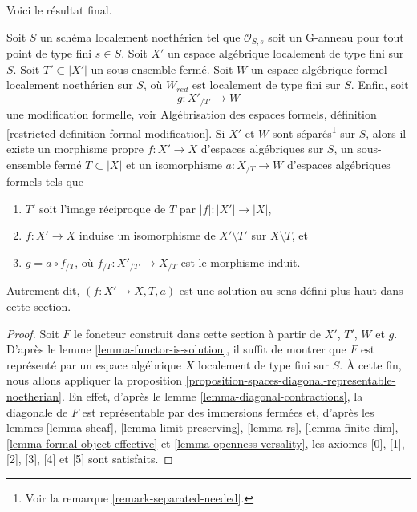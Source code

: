 \noindent
Voici le résultat final.

\begin{theorem}
\label{theorem-contractions}
\begin{reference}
\cite[théorème 3.1]{ArtinII}
\end{reference}
Soit $S$ un schéma localement noethérien tel que $\mathcal{O}_{S, s}$
soit un G-anneau pour tout point de type fini $s \in S$. Soit $X'$ un espace algébrique
localement de type fini sur $S$. Soit $T' \subset |X'|$ un sous-ensemble fermé.
Soit $W$ un espace algébrique formel localement noethérien sur $S$,
où $W_{red}$ est localement de type fini sur $S$. Enfin, soit
$$
g : X'_{/T'} \longrightarrow W
$$
une modification formelle, voir Algébrisation des espaces formels, définition
\ref{restricted-definition-formal-modification}. Si $X'$ et $W$ sont
séparés\footnote{Voir la remarque \ref{remark-separated-needed}.} sur $S$, alors
il existe un morphisme propre $f : X' \to X$ d'espaces algébriques sur $S$,
un sous-ensemble fermé $T \subset |X|$ et un isomorphisme $a : X_{/T} \to W$
d'espaces algébriques formels tels que
\begin{enumerate}
\item $T'$ soit l'image réciproque de $T$ par $|f| : |X'| \to |X|$,
\item $f : X' \to X$ induise un isomorphisme de $X' \setminus T'$ sur
$X \setminus T$, et
\item $g = a \circ f_{/T}$, où $f_{/T} : X'_{/T'} \to X_{/T}$
est le morphisme induit.
\end{enumerate}
Autrement dit, $(f : X' \to X, T, a)$ est une solution au sens défini plus haut dans
cette section.
\end{theorem}

\begin{proof}
Soit $F$ le foncteur construit dans cette section à partir de $X'$, $T'$, $W$ et $g$.
D'après le lemme \ref{lemma-functor-is-solution}, il suffit de montrer que
$F$ est représenté par un espace algébrique $X$ localement de type fini sur $S$.
À cette fin, nous allons appliquer la
proposition \ref{proposition-spaces-diagonal-representable-noetherian}.
En effet, d'après le lemme \ref{lemma-diagonal-contractions},
la diagonale de $F$ est représentable par des immersions fermées
et, d'après les
lemmes \ref{lemma-sheaf}, \ref{lemma-limit-preserving},
\ref{lemma-rs}, \ref{lemma-finite-dim},
\ref{lemma-formal-object-effective} et \ref{lemma-openness-versality},
les axiomes [0], [1], [2], [3], [4] et [5] sont satisfaits.
\end{proof}

